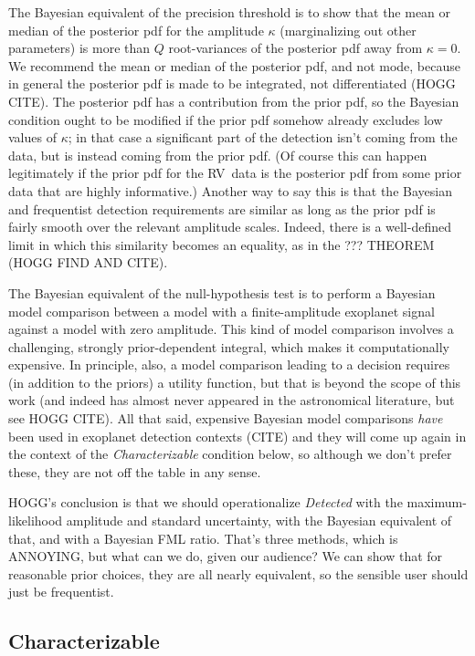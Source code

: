 \documentclass[modern]{aastex63}
\newcommand{\acronym}[1]{{\small{#1}}}
\newcommand{\rv}{\acronym{RV}}
\begin{document}
The Bayesian equivalent of the precision threshold is to show that the
mean or median of the posterior pdf for the amplitude $\kappa$
(marginalizing out other parameters) is more than $Q$ root-variances
of the posterior pdf away from $\kappa=0$.
We recommend the mean or median of the posterior pdf, and not mode,
because in general the posterior pdf is made to be integrated, not
differentiated (HOGG CITE).
The posterior pdf has a contribution from the prior pdf, so the Bayesian
condition ought to be modified if the prior pdf somehow already excludes
low values of $\kappa$; in that case a significant part of the detection
isn't coming from the data, but is instead coming from the prior pdf.
(Of course this can happen legitimately if the prior pdf for the \rv\ data
is the posterior pdf from some prior data that are highly informative.)
Another way to say this is that the Bayesian and frequentist detection
requirements are similar as long as the prior pdf is fairly smooth over
the relevant amplitude scales.
Indeed, there is a well-defined limit in which this similarity becomes
an equality, as in the ??? THEOREM (HOGG FIND AND CITE).

The Bayesian equivalent of the null-hypothesis test is to perform a
Bayesian model comparison between a model with a finite-amplitude
exoplanet signal against a model with zero amplitude.
This kind of model comparison involves a challenging, strongly
prior-dependent integral, which makes it computationally expensive.
In principle, also, a model comparison leading to a decision requires
(in addition to the priors) a utility function, but that is beyond the
scope of this work (and indeed has almost never appeared in the
astronomical literature, but see HOGG CITE).
All that said, expensive Bayesian model comparisons \emph{have} been
used in exoplanet detection contexts (CITE) and they will come up
again in the context of the \textsl{Characterizable} condition below,
so although we don't prefer these, they are not off the table in any
sense.

HOGG's conclusion is that we should operationalize \textsl{Detected}
with the maximum-likelihood amplitude and standard uncertainty, with
the Bayesian equivalent of that, and with a Bayesian FML ratio. That's
three methods, which is ANNOYING, but what can we do, given our
audience?  We can show that for reasonable prior choices, they are all
nearly equivalent, so the sensible user should just be frequentist.

\subsection{Characterizable}
\end{document}
